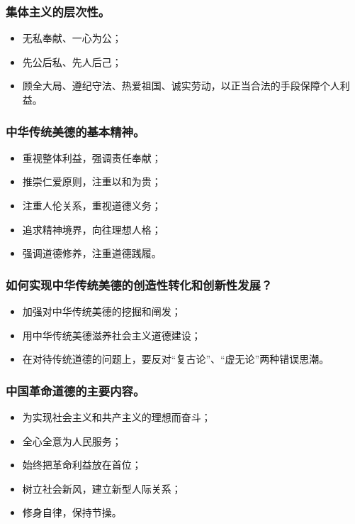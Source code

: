\documentclass{article}
\begin{document}
\subsubsection{集体主义的层次性。}
\begin{itemize}
    \item 无私奉献、一心为公；
    \item 先公后私、先人后己；
    \item 顾全大局、遵纪守法、热爱祖国、诚实劳动，以正当合法的手段保障个人利益。
\end{itemize}

\subsubsection{中华传统美德的基本精神。}
\begin{itemize}
    \item 重视整体利益，强调责任奉献；
    \item 推崇仁爱原则，注重以和为贵；
    \item 注重人伦关系，重视道德义务；
    \item 追求精神境界，向往理想人格；
    \item 强调道德修养，注重道德践履。
\end{itemize}

\subsubsection{如何实现中华传统美德的创造性转化和创新性发展？}
\begin{itemize}
    \item 加强对中华传统美德的挖掘和阐发；
    \item 用中华传统美德滋养社会主义道德建设；
    \item 在对待传统道德的问题上，要反对“复古论”、“虚无论”两种错误思潮。
\end{itemize}

\subsubsection{中国革命道德的主要内容。}
\begin{itemize}
    \item 为实现社会主义和共产主义的理想而奋斗；
    \item 全心全意为人民服务；
    \item 始终把革命利益放在首位；
    \item 树立社会新风，建立新型人际关系；
    \item 修身自律，保持节操。
\end{itemize}
\end{document}
